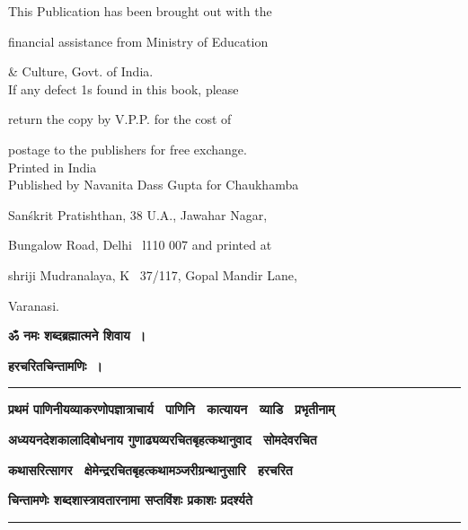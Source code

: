 \documentclass[11pt, openany]{book}
\begin{document}
\vspace{35mm}
This Publication has been brought out with the

financial assistance from Ministry of Education 

\& Culture, Govt. of India.\\

If any defect 1s found in this book, please 

return the copy by V.P.P. for the cost of 

postage to the publishers for free exchange.\\

Printed in India\\

Published by Navanita Dass Gupta for Chaukhamba 

Sanśkrit Pratishthan, 38 U.A., Jawahar Nagar, 

Bungalow Road, Delhi \textendash\ l110 007 and printed at 

shriji Mudranalaya, K \textendash\ 37/117, Gopal Mandir Lane, 

Varanasi.

\newpage
\thispagestyle{empty}
\begin{center}
\textbf{ॐ नमः शब्दब्रह्मात्मने शिवाय~।}

\textbf{\LARGE हरचरितचिन्तामणिः~।}\\
\rule{0.2\linewidth}{0.5pt}

\textbf{प्रथमं पाणिनीयव्याकरणोपज्ञात्राचार्य \textendash\ पाणिनि \textendash\ कात्यायन \textendash\ व्याडि \textendash\ प्रभृतीनाम्}

\textbf{अध्ययनदेशकालादिबोधनाय गुणाढ्यव्यरचितबृहत्कथानुवाद \textendash\ सोमदेवरचित \textendash\ }

\textbf{कथासरित्सागर \textendash\ क्षेमेन्द्ररचितबृहत्कथामञ्जरीग्रन्थानुसारि \textendash\ हरचरित \textendash\ }

\textbf{चिन्तामणेः शब्दशास्त्रावतारनामा सप्तविंशः प्रकाशः प्रदर्श्यते \textendash\ }\\

\rule{1\linewidth}{0.5pt}\\
\end{center}
\end{document}
